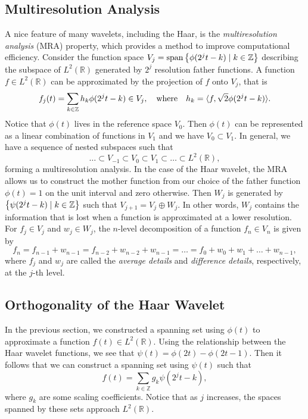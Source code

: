 \documentclass[12pt]{article}
\DeclarePairedDelimiter{\iprod}{\langle}{\rangle}
\def\RR{\mathbb{R}}
\def\ZZ{\mathbb{Z}}
\DeclareMathOperator{\spans}{span}
\theoremstyle{definition}
\begin{document}
  \subsection{Multiresolution Analysis}
  \label{sub:mra}
  A nice feature of many wavelets, including the Haar, is the \textit{multiresolution analysis} (MRA) property, which provides a method to improve computational efficiency. Consider the function space \(V_j = \spans\qty{\phi(2^jt-k) \mid k \in \ZZ}\) describing the subspace of \(L^2(\mathbb{R})\) generated by \(2^j\) resolution father functions. A function \(f \in L^2(\RR)\) can be approximated by the projection of \(f\) onto \(V_j\), that is
  \begin{equation} \label{eqn:proj-f-onto-vj}
    f_j(t) = \sum_{k \in \ZZ} h_k \phi(2^jt-k) \in V_j, 
    \qq{where}
    h_k = \iprod{f,\sqrt{2}\phi(2^jt-k)}.
  \end{equation}
  Notice that \(\phi(t)\) lives in the reference space \(V_0\). Then \(\phi(t)\) can be represented as a linear combination of functions in \(V_1\) and we have \(V_0 \subset V_1\). In general, we have a sequence of nested subspaces such that
  \begin{equation} \label{eqn:mra}
    \dots \subset V_{-1} \subset V_0 \subset V_1 \subset \dots \subset L^2(\mathbb{R}),
  \end{equation}
  forming a multiresolution analysis. In the case of the Haar wavelet, the MRA allows us to construct the mother function from our choice of the father function \(\phi(t) = 1\) on the unit interval and zero otherwise. Then \(W_j\) is generated by \(\qty{\psi(2^jt-k) \mid k \in \ZZ}\) such that \(V_{j+1} = V_j \oplus W_j\). In other words, \(W_j\) contains the information that is lost when a function is approximated at a lower resolution. For \(f_j \in V_j\) and \(w_j \in W_j\), the \(n\)-level decomposition of a function \(f_n \in V_n\) is given by
  \[f_n = f_{n-1} + w_{n-1} = f_{n-2} + w_{n-2} + w_{n-1} = \dots = f_0 + w_0 + w_1 + \dots + w_{n-1},\]
  where \(f_j\) and \(w_j\) are called the \textit{average details} and \textit{difference details}, respectively, at the \(j\)-th level.

  \subsection{Orthogonality of the Haar Wavelet}

  In the previous section, we constructed a spanning set using \(\phi(t)\) to approximate a function \(f(t) \in L^2(\RR)\). Using the relationship between the Haar wavelet functions, we see that \(\psi(t) = \phi(2t) - \phi(2t-1)\). Then it follows that we can construct a spanning set using \(\psi(t)\) such that
  \begin{equation} \label{eqn:proj-f-onto-wj}
    f(t) = \sum_{k \in \ZZ} g_k \psi(2^jt-k),
  \end{equation}
  where \(g_k\) are some scaling coefficients. Notice that as \(j\) increases, the spaces spanned by these sets approach \(L^2(\RR)\).
\end{document}

